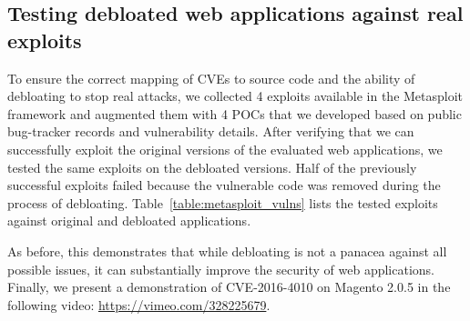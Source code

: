 \subsection{Testing debloated web applications against real exploits}
\label{section:metasploit}
To ensure the correct mapping of CVEs to source code and the ability of debloating to stop real attacks, we collected 4 exploits available in the Metasploit framework and augmented them with 4 POCs that we developed based on public bug-tracker records and vulnerability details. After verifying that we can successfully exploit the original versions of the evaluated web applications, we tested the same exploits on the debloated versions. Half of the previously successful exploits failed because the vulnerable code was removed during the process of debloating. Table~\ref{table:metasploit_vulns} lists the tested exploits against original and debloated applications.

As before, this demonstrates that while debloating is not a panacea against all possible issues, it can substantially improve the security of web applications. Finally, we present a demonstration of CVE-2016-4010 on Magento 2.0.5 in the following video: \url{https://vimeo.com/328225679}.

